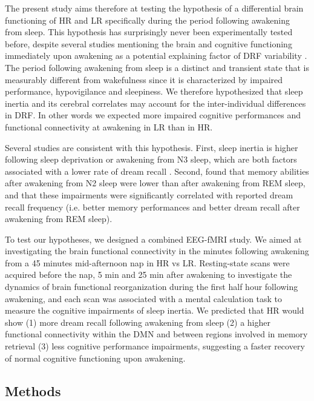 The present study aims therefore at testing the hypothesis of a differential brain functioning of HR and LR specifically during the period following awakening from sleep. This hypothesis has surprisingly never been experimentally tested before, despite several studies mentioning the brain and cognitive functioning immediately upon awakening as a potential explaining factor of DRF variability \citep{schredl_factors_2003, conduit_poor_2004}. The period following awakening from sleep is a distinct and transient state that is measurably different from wakefulness since it is characterized by impaired performance, hypovigilance and sleepiness. We therefore hypothesized that sleep inertia and its cerebral correlates may account for the inter-individual differences in DRF. In other words we expected more impaired cognitive performances and functional connectivity at awakening in LR than in HR.

Several studies are consistent with this hypothesis. First, sleep inertia is higher following sleep deprivation or awakening from N3 sleep, which are both factors associated with a lower rate of dream recall \citep{nielsen_review_2000, de_gennaro_recovery_2010}. Second, \citet{conduit_poor_2004} found that memory abilities after awakening from N2 sleep were lower than after awakening from REM sleep, and that these impairments were significantly correlated with reported dream recall frequency (i.e. better memory performances and better dream recall after awakening from REM sleep).

To test our hypotheses, we designed a combined EEG-fMRI study. We aimed at investigating the brain functional connectivity in the minutes following awakening from a 45 minutes mid-afternoon nap in HR vs LR. Resting-state scans were acquired before the nap, 5 min and 25 min after awakening to investigate the dynamics of brain functional reorganization during the first half hour following awakening, and each scan was associated with a mental calculation task to measure the cognitive impairments of sleep inertia. We predicted that HR would show (1) more dream recall following awakening from sleep (2) a higher functional connectivity within the DMN and between regions involved in memory retrieval (3) less cognitive performance impairments, suggesting a faster recovery of normal cognitive functioning upon awakening.

\subsection*{Methods}
\label{res:inertia:drf:methods}

